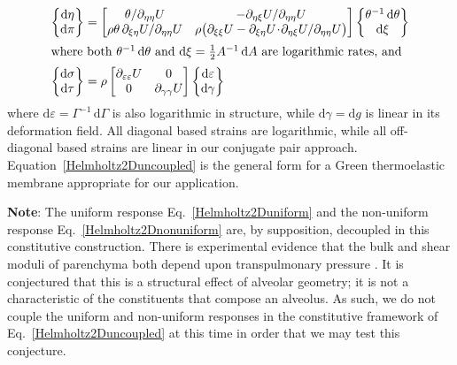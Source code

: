 \begin{subequations}
\label{Helmholtz2Duncoupled}
\begin{align}
\left\{ \begin{matrix}
\mathrm{d} \eta \\ \mathrm{d} \pi 
\end{matrix} \right\} & = \begin{bmatrix}
\theta / \partial_{\eta\eta} U & 
-\partial_{\eta\xi} U / \partial_{\eta\eta} U \\ 
\rho \theta \, \partial_{\xi\eta} U / \partial_{\eta\eta} U & 
\rho \bigl( \partial_{\xi\xi} U - \partial_{\xi\eta} U \!\cdot\! \partial_{\eta\xi} U / \partial_{\eta\eta} U \bigr)  
\end{bmatrix} 
\left\{ \begin{matrix}
\theta^{-1} \, \mathrm{d}\theta \\ \mathrm{d} \xi 
\end{matrix} \right\}
\label{Helmholtz2Duniform} \\
\intertext{where both $\theta^{-1} \, \mathrm{d}\theta$ and $\mathrm{d} \xi = \tfrac{1}{2} A^{-1} \, \mathrm{d}A$ are logarithmic rates, and}
\left\{ \begin{matrix}
    \mathrm{d} \sigma \\ \mathrm{d} \tau
\end{matrix} \right\} & = \rho \begin{bmatrix}
    \partial_{\varepsilon\varepsilon} U & 0 \\
    0 & \partial_{\gamma\gamma} U 
\end{bmatrix} 
\left\{ \begin{matrix}
    \mathrm{d} \varepsilon \\ \mathrm{d} \gamma
\end{matrix} \right\}
\label{Helmholtz2Dnonuniform}
\end{align} 
\end{subequations}
where $\mathrm{d} \varepsilon = \Gamma^{-1} \, \mathrm{d} \Gamma$ is also logarithmic in structure, while $\mathrm{d} \gamma = \mathrm{d} g$ is linear in its deformation field.  All diagonal based strains are logarithmic, while all off-diagonal based strains are linear in our conjugate pair approach.  Equation~\ref{Helmholtz2Duncoupled} is the general form for a Green thermo\-elastic membrane appropriate for our application.

\medskip\noindent
\textbf{Note}:  The uniform response Eq.~\ref{Helmholtz2Duniform} and the non-uniform response Eq.~\ref{Helmholtz2Dnonuniform} are, by supposition, decoupled in this constitutive construction.  There is experimental evidence that the bulk and shear moduli of parenchyma both depend upon transpulmonary pressure \cite{LaiFook79,Jahedetal90,ClaytonFreed20,Clayton2019TRL}.  It is conjectured that this is a structural effect of alveolar geometry; it is not a characteristic of the constituents that compose an alveolus.  As such, we do not couple the uniform and non-uniform responses in the constitutive framework of Eq.~\ref{Helmholtz2Duncoupled} at this time in order that we may test this conjecture.

